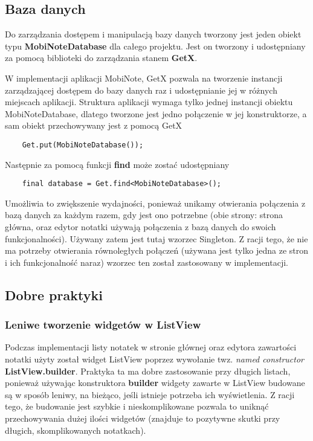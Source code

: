 \subsection{Baza danych}

Do zarządzania dostępem i manipulacją bazy danych tworzony jest jeden obiekt typu \textbf{MobiNoteDatabase} dla całego projektu. Jest on tworzony i udostępniany za pomocą biblioteki do zarządzania stanem \textbf{GetX}. 

W implementacji aplikacji MobiNote, GetX pozwala na tworzenie instancji zarządzającej dostępem do bazy danych raz i udostępnianie jej w różnych miejscach aplikacji. Struktura aplikacji wymaga tylko jednej instancji obiektu MobiNoteDatabase, dlatego tworzone jest jedno połączenie w jej konstruktorze, a sam obiekt przechowywany jest z pomocą GetX

\begin{verbatim}
    Get.put(MobiNoteDatabase());
\end{verbatim}

\noindent Następnie za pomocą funkcji \textbf{find} może zostać udostępniany

\begin{verbatim}
    final database = Get.find<MobiNoteDatabase>();
\end{verbatim}

Umożliwia to zwiększenie wydajności, ponieważ unikamy otwierania połączenia z bazą danych za każdym razem, gdy jest ono potrzebne (obie strony: strona główna, oraz edytor notatki używają połączenia z bazą danych do swoich funkcjonalności). Używany zatem jest tutaj wzorzec Singleton. Z racji tego, że nie ma potrzeby otwierania równoległych połączeń (używana jest tylko jedna ze stron i ich funkcjonalność naraz) wzorzec ten został zastosowany w implementacji.

\subsection{Dobre praktyki}

\subsubsection{Leniwe tworzenie widgetów w ListView}

Podczas implementacji listy notatek w stronie głównej oraz edytora zawartości notatki użyty został widget ListView poprzez wywołanie twz. \textit{named constructor} \textbf{ListView.builder}. Praktyka ta ma dobre zastosowanie przy długich listach, ponieważ używając konstruktora \textbf{builder} widgety zawarte w ListView budowane są w sposób leniwy, na bieżąco, jeśli istnieje potrzeba ich wyświetlenia. Z racji tego, że budowanie jest szybkie i nieskomplikowane pozwala to uniknąć przechowywania dużej ilości widgetów (znajduje to pozytywne skutki przy długich, skomplikowanych notatkach).

